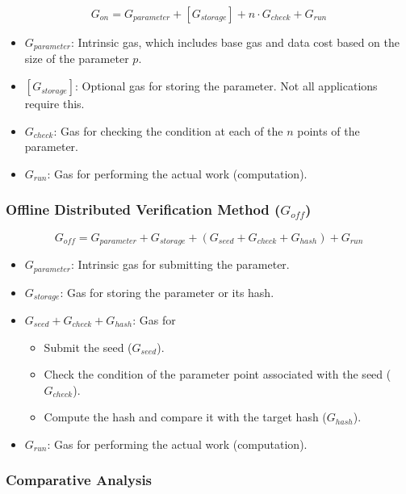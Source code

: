 \documentclass[runningheads]{llncs}
\begin{document}
\begin{equation}
G_{on} = G_{parameter} + [G_{storage}] + n \cdot G_{check} + G_{run}
\end{equation}

\begin{itemize}
    \item \( G_{parameter} \): Intrinsic gas, which includes base gas and data cost based on the size of the parameter \( p \).
    \item \( [G_{storage}] \): Optional gas for storing the parameter. Not all applications require this.
    \item \( G_{check} \): Gas for checking the condition at each of the \( n \) points of the parameter.
    \item \( G_{run} \): Gas for performing the actual work (computation).
\end{itemize}

\subsubsection{Offline Distributed Verification Method (\( G_{off} \))}

\begin{equation}
G_{off} = G_{parameter} + G_{storage} +   (G_{seed} + G_{check} + G_{hash}) + G_{run}
\end{equation}

\begin{itemize}
    \item \( G_{parameter} \): Intrinsic gas for submitting the parameter.
    \item \( G_{storage} \): Gas for storing the parameter or its hash.
    \item \( G_{seed} + G_{check} + G_{hash} \): Gas for 
    \begin{itemize}
        \item Submit the seed (\( G_{seed} \)).
        \item Check the condition of the parameter point associated with the seed (\( G_{check} \)).
        \item Compute the hash and compare it with the target hash (\( G_{hash} \)).
    \end{itemize}
    \item \( G_{run} \): Gas for performing the actual work (computation).
\end{itemize}


\subsubsection{Comparative Analysis}
\end{document}
